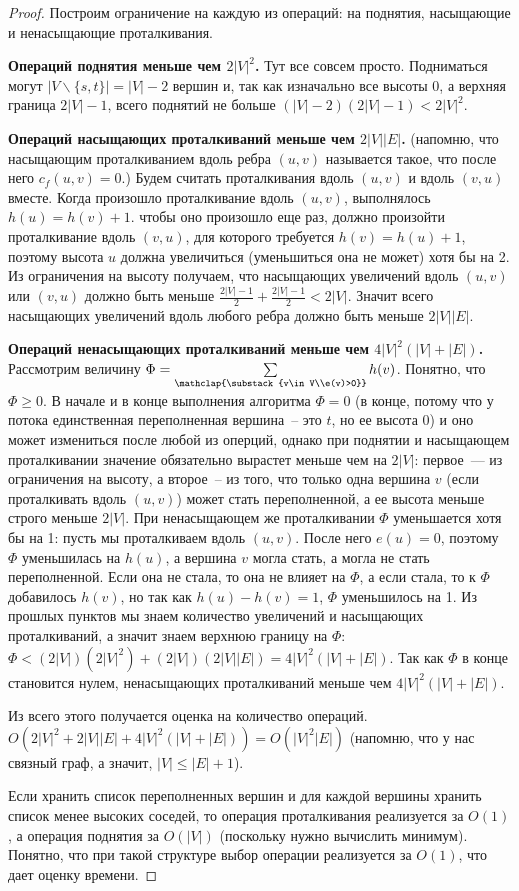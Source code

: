 \begin{proof}Построим ограничение на каждую из операций: на поднятия, насыщающие и ненасыщающие проталкивания.

{\bf Операций поднятия меньше чем $2|V|^2$.} Тут все совсем просто. Подниматься могут $|V\smallsetminus\{s,t\}|=|V|-2$ вершин и, так как изначально все высоты 0, а верхняя граница $2|V|-1$, всего поднятий не больше $(|V|-2)(2|V|-1)<2|V|^2$.

{\bf Операций насыщающих проталкиваний меньше чем $2|V||E|$.} (напомню, что насыщающим проталкиванием вдоль ребра $(u,v)$ называется такое, что после него $c_f(u,v)=0$.) Будем считать проталкивания вдоль $(u,v)$ и вдоль $(v,u)$ вместе. Когда произошло проталкивание вдоль $(u,v)$, выполнялось $h(u)=h(v)+1$. чтобы оно произошло еще раз, должно произойти проталкивание вдоль $(v,u)$, для которого требуется $h(v)=h(u)+1$, поэтому высота $u$ должна увеличиться (уменьшиться она не может) хотя бы на 2. Из ограничения на высоту получаем, что насыщающих увеличений вдоль $(u,v)$ или $(v,u)$ должно быть меньше $\frac{2|V|-1}{2}+\frac{2|V|-1}{2}<2|V|$. Значит всего насыщающих увеличений вдоль любого ребра должно быть меньше $2|V||E|$.

{\bf Операций ненасыщающих проталкиваний меньше чем $4|V|^2(|V|+|E|)$.} Рассмотрим величину $\Phi=\sum\limits_{\mathclap{\substack{v\in V\\e(v)>0}}}h(v)$. Понятно, что $\Phi\ge0$. В начале и в конце выполнения алгоритма $\Phi=0$ (в конце, потому что у потока единственная переполненная вершина~-- это $t$, но ее высота 0) и оно может измениться после любой из оперций, однако при поднятии и насыщающем проталкивании значение обязательно вырастет меньше чем на $2|V|$: первое~--- из ограничения на высоту, а второе~-- из того, что только одна вершина $v$ (если проталкивать вдоль $(u,v)$) может стать переполненной, а ее высота меньше строго меньше $2|V|$.
При ненасыщающем же проталкивании $\Phi$ уменьшается хотя бы на 1: пусть мы проталкиваем вдоль $(u,v)$. После него $e(u)=0$, поэтому $\Phi$ уменьшилась на $h(u)$, а вершина $v$ могла стать, а могла не стать переполненной. Если она не стала, то она не влияет на $\Phi$, а если стала, то к $\Phi$ добавилось $h(v)$, но так как $h(u)-h(v)=1$, $\Phi$ уменьшилось на 1.
Из прошлых пунктов мы знаем количество увеличений и насыщающих проталкиваний, а значит знаем верхнюю границу на $\Phi$: $\Phi<(2|V|)(2|V|^2)+(2|V|)(2|V||E|)=4|V|^2(|V|+|E|)$. Так как $\Phi$ в конце становится нулем, ненасыщающих проталкиваний меньше чем $4|V|^2(|V|+|E|)$.

Из всего этого получается оценка на количество операций. $O(2|V|^2+2|V||E|+4|V|^2(|V|+|E|))=O(|V|^2|E|)$ (напомню, что у нас связный граф, а значит, $|V|\le |E|+1$).

Если хранить список переполненных вершин и для каждой вершины хранить список менее высоких соседей, то операция проталкивания реализуется за $O(1)$, а операция поднятия за $O(|V|)$ (поскольку нужно вычислить минимум). Понятно, что при такой структуре выбор операции реализуется за $O(1)$, что дает оценку времени.
\end{proof}
